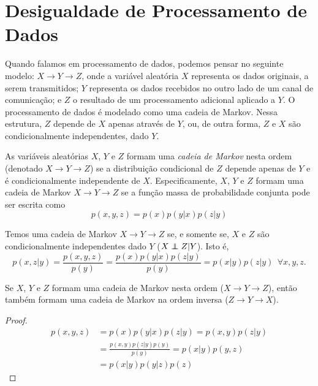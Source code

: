 \section{Desigualdade de Processamento de Dados}
Quando falamos em processamento de dados, podemos pensar no seguinte modelo:
$X \rightarrow Y \rightarrow Z$, onde a variável aleatória $X$ representa
os dados originais, a serem transmitidos; $Y$ representa os dados recebidos no outro lado de um canal 
de comunicação; e $Z$ o resultado de um processamento adicional aplicado a $Y$.
O processamento de dados é modelado como uma cadeia de Markov.
Nessa estrutura, $Z$ depende de $X$ apenas através de $Y$,
ou, de outra forma, $Z$ e $X$ são condicionalmente independentes, dado $Y$.


\begin{definition}\label{def:markovchain}
As variáveis aleatórias $X$, $Y$ e $Z$ formam uma \emph{cadeia de Markov} nesta ordem
(denotado $X \rightarrow Y \rightarrow Z$) se a distribuição condicional de $Z$
depende apenas de $Y$ e é condicionalmente independente de $X$. Especificamente,
$X$, $Y$ e $Z$ formam uma cadeia de Markov $X \rightarrow Y \rightarrow Z$ se
a função massa de probabilidade conjunta pode ser escrita como
\begin{equation}\label{eq:markov}
p(x,y,z) = p(x) p(y|x) p(z|y)
\end{equation}
\end{definition}

Temos uma cadeia de Markov $X \rightarrow Y \rightarrow Z$ se, e somente se,
$X$ e $Z$ são condicionalmente independentes dado $Y$ ($X \independent Z | Y$).
Isto é,
\begin{equation}
p(x,z|y) = \frac{p(x,y,z)}{p(y)} = \frac{p(x)p(y|x)p(z|y)}{p(y)} = p(x|y) p(z|y) \ \ \forall x,y,z .
\end{equation}

\begin{proposition}\label{prop:markovinv}
Se $X$, $Y$ e $Z$ formam uma cadeia de Markov nesta ordem ($X \rightarrow Y \rightarrow Z$), então
também formam uma cadeia de Markov na ordem inversa ($Z \rightarrow Y \rightarrow X$).
\end{proposition}
\begin{proof}
\begin{subequations}\label{dem:markovinv}
\begin{align}
p(x,y,z) &= p(x)p(y|x)p(z|y) = p(x,y)p(z|y) \\
         &= \frac{p(x,y)p(z|y)p(y)}{p(y)} = p(x|y) p(y,z) \\
         &= p(x|y) p(y|z) p(z)
\end{align}
\end{subequations}
\end{proof}


